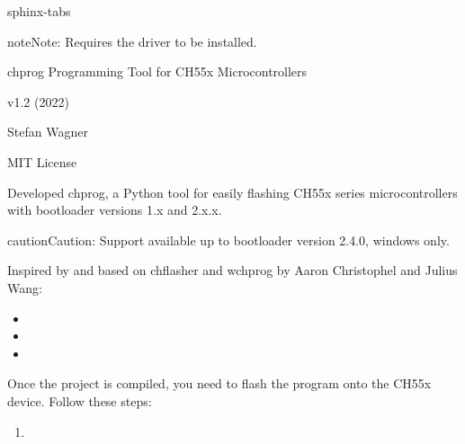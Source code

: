 \documentclass[letterpaper,10pt,english]{sphinxmanual}
\begin{document}
\begin{sphinxuseclass}{sphinx-tabs}
\begin{sphinxadmonition}{note}{Note:}
\sphinxAtStartPar
Requires the  driver to be installed.
\end{sphinxadmonition}

\sphinxAtStartPar
{}

\sphinxAtStartPar
{} chprog \sphinxhyphen{} Programming Tool for CH55x Microcontrollers

\sphinxAtStartPar
{} v1.2 (2022)

\sphinxAtStartPar
{} Stefan Wagner

\sphinxAtStartPar
{} 

\sphinxAtStartPar
{} MIT License

\sphinxAtStartPar
{}
Developed chprog, a Python tool for easily flashing CH55x series microcontrollers with bootloader versions 1.x and 2.x.x.

\begin{sphinxadmonition}{caution}{Caution:}
\sphinxAtStartPar
Support available up to bootloader version 2.4.0, windows only.
\end{sphinxadmonition}

\sphinxAtStartPar
{}
Inspired by and based on chflasher and wchprog by Aaron Christophel and Julius Wang:
\begin{itemize}
\item {} 
\sphinxAtStartPar
{}

\item {} 
\sphinxAtStartPar
{}

\item {} 
\sphinxAtStartPar
{}

\end{itemize}

\sphinxAtStartPar
Once the project is compiled, you need to flash the program onto the CH55x device. Follow these steps:
\begin{enumerate}
%
\item {} 
\sphinxAtStartPar
{}


\end{enumerate}
\end{sphinxuseclass}
\end{document}
